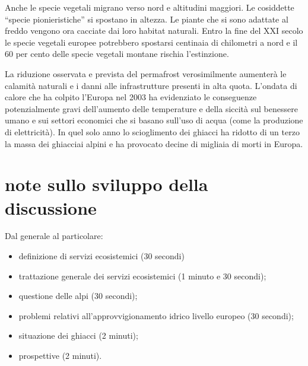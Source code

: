 \documentclass[12pt,a4paper]{article}
\begin{document}
		Anche le specie vegetali migrano verso nord e altitudini maggiori. Le cosiddette ``specie pionieristiche'' si spostano in altezza. Le piante che si sono adattate al freddo vengono ora cacciate dai loro habitat naturali. Entro la fine del XXI secolo le specie vegetali europee potrebbero spostarsi centinaia di chilometri a nord e il 60 per cento delle specie vegetali montane rischia l'estinzione.
		
		La riduzione osservata e prevista del permafrost verosimilmente aumenterà le calamità naturali e i danni alle infrastrutture presenti in alta quota. L'ondata di calore che ha colpito l'Europa nel 2003 ha evidenziato le conseguenze potenzialmente gravi dell'aumento delle temperature e della siccità sul benessere umano e sui settori economici che si basano sull'uso di acqua (come la produzione di elettricità). In quel solo anno lo scioglimento dei ghiacci ha ridotto di un terzo la massa dei ghiacciai alpini e ha provocato decine di migliaia di morti in Europa.
	
	\newpage
	
	
	
	\newpage
	\appendix
	\section{note sullo sviluppo della discussione}
	Dal generale al particolare:
	\begin{itemize}
		\item definizione di servizi ecosistemici (30 secondi)
		\item trattazione generale dei servizi ecosistemici (1 minuto e 30 secondi);
		\item questione delle alpi (30 secondi);
		\item problemi relativi all'approvvigionamento idrico livello europeo (30 secondi);
		\item situazione dei ghiacci (2 minuti);
		\item prospettive  (2 minuti).
	\end{itemize}
\end{document}
